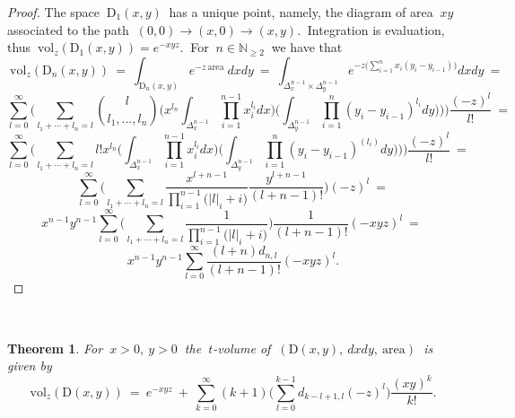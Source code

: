 \documentclass[10pt,leqeq]{article}
\newtheorem{thm}{Theorem}%
\begin{document}
\begin{proof} 
The space $\ \mathrm{D}_1(x,y) \ $ has a unique point, namely, the diagram of area $\ xy \ $ associated to the path $ \ (0,0)\rightarrow (x,0) \rightarrow (x,y). \ $ Integration is  evaluation, thus
$\ \mathrm{vol}_{z}(\mathrm{D}_1(x,y)) =e^{-xyz}. \ $ For $\ n \in \mathbb{N}_{\geq 2} \ $ we have that
$$ \ \mathrm{vol}_z(\mathrm{D}_n(x,y)) \ = \ \int_{\mathrm{D}_n(x,y)}e^{-z  \ \mathrm{area}}\ dxdy \ = \
\int_{\Delta^{n-1}_x \times \Delta^{n-1}_y}e^{-z\big(\sum_{i=1}^{n}x_i(y_i-y_{i-1}) \big)}dxdy \ = $$
$$ \sum_{l=0}^{\infty} \bigg( \sum_{l_1+\cdots+l_n=l}\binom{l}{l_1,...,l_n}
\bigg( x^{l_n}\int_{\Delta^{n-1}_x }\prod_{i=1}^{n-1}x_i^{l_i}dx \bigg)   
\bigg( \int_{\Delta^{n-1}_y }\prod_{i=1}^{n}(y_i-y_{i-1})^{l_i}dy \big)\bigg)\bigg) \frac{(-z)^l}{l!} \ = $$
$$ \sum_{l=0}^{\infty} \bigg( \sum_{l_1+\cdots+l_n=l}l!
x^{l_n}\bigg(\int_{\Delta^{n-1}_x }\prod_{i=1}^{n-1}x_i^{l_i}dx \bigg)   
\bigg( \int_{\Delta^{n-1}_y }\prod_{i=1}^{n}(y_i-y_{i-1})^{(l_i)}dy \big)\bigg) \bigg)\frac{(-z)^l}{l!} \ = $$
$$ \sum_{l=0}^{\infty} \bigg( \sum_{l_1+\cdots+l_n=l}
 \frac{x^{l+n-1}}{\prod_{i=1}^{n-1}\big(|l|_i+i\big)}\frac{y^{l+n-1}}{(l+n-1)!}\bigg) (-z)^l \ = $$
$$ x^{n-1}y^{n-1}\sum_{l=0}^{\infty}\bigg( \sum_{l_1+\cdots+l_n=l}
 \frac{1}{\prod_{i=1}^{n-1}\big(|l|_i+i\big)}\bigg) \frac{1}{(l+n-1)!}  (-xyz)^l\ = \ $$
$$  x^{n-1}y^{n-1}\sum_{l=0}^{\infty} \frac{(l+n)d_{n,l}}{(l+n-1)!} (-xyz)^l.$$ 
\end{proof}

\



\begin{thm}
{\em For $\ x>0,\ y>0 \ $ the $\ t$-volume 
 of  $\ (\mathrm{D}(x,y),\ dxdy,\ \mathrm{area}) \ $ is given by
$$ \mathrm{vol}_{z}(\mathrm{D}(x,y))  \ = \ e^{-xyz} \ + \ \sum_{k=0}^{\infty}(k+1)\bigg(\sum_{l=0}^{k-1} d_{k-l+1,l} (-z)^l\bigg)\frac{(xy)^{k}}{k!}.$$
}  
\end{thm}
\end{document}
